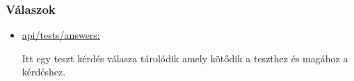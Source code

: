 \subsubsection{Válaszok}
\begin{itemize}[label={$\bullet$}, topsep=0pt, itemsep=0pt, leftmargin=15pt]
    \item[] {\url{api/tests/answers:}}
          \begin{addmargin}[\parindent]{0pt}
              Itt egy teszt kérdés válasza tárolódik amely kötődik a teszthez és magához a kérdéshez.

              \begin{json}
                \end{json}
          \end{addmargin}
\end{itemize}

